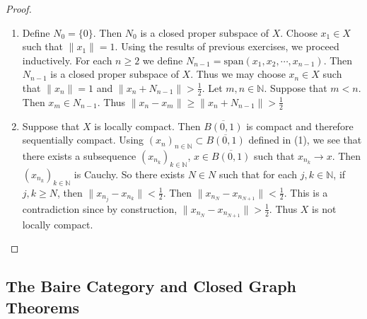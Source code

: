 \documentclass[12pt]{amsart}
\theoremstyle{definition}
\newcommand{\N}{\mathbb{N}}
\newcommand{\conv}[1]{\xrightarrow{#1}}
\begin{document}
	\begin{proof}\
		\begin{enumerate}
			\item Define $N_0 = \{0\}$. Then $N_0$ is a closed proper subspace of $X$. Choose $x_1 \in X$ such that $\|x_1 \|= 1$. Using the results of previous exercises, we proceed inductively. For each $n \geq 2$ we define $N_{n-1} = \text{span}(x_1, x_2, \cdots, x_{n-1})$. Then $N_{n-1}$ is a closed proper subspace of $X$. Thus we may choose $x_n \in X$ such that $\|x_n \|= 1$ and $\|x_n + N_{n-1} \|>  \frac{1}{2}$. Let $m,n \in \N$. Suppose that $m<n$. Then $x_m \in N_{n-1}$. Thus $\|x_n - x_m \|\geq \|x_n + N_{n-1} \|> \frac{1}{2}$\vspace{.5cm}\\
			\item Suppose that $X$ is locally compact. Then $\overline{B(0,1)}$ is compact and therefore sequentially compact. Using $(x_n)_{n \in \N} \subset \overline{B(0,1)}$ defined in (1), we see that there exists a subsequence $(x_{n_k})_{k \in \N}$, $x \in \overline{B(0,1)}$ such that $x_{n_k} \conv{} x$. Then $(x_{n_k})_{k \in \N}$ is Cauchy. So there exists $N \in N$ such that for each $j, k \in \N$, if $j, k \geq N$, then $\|x_{n_j} - x_{n_k} \|< \frac{1}{2}$. Then $\|x_{n_N} - x_{n_{N+1}} \| < \frac{1}{2}$. This is a contradiction since by construction, $\|x_{n_N} - x_{n_{N+1}} \| > \frac{1}{2}$. Thus $X$ is not locally compact.
		\end{enumerate}
	\end{proof}
	
	
	
	
	
	
	
	
	
	
	
	
	
	
	
	
	
	

	
	
	
	
	
	
	
	
	
	
	
	
	
	
	
	
	
	
	
	
	
	
	
	\newpage
	\subsection{The Baire Category and Closed Graph Theorems}
	
\end{document}

